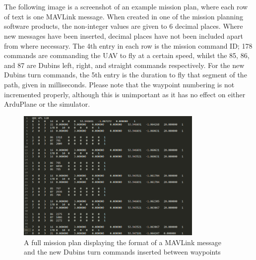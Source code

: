 \chapter{} 
\label{app:missionplan}

\graphicspath{{Appendix2/Figs/}}


\renewcommand{\thefigure}{B\arabic{figure}}

\setcounter{figure}{0}

The following image is a screenshot of an example mission plan, where each row of text is one MAVLink message. When created in one of the mission planning software products, the non-integer values are given to 6 decimal places. Where new messages have been inserted, decimal places have not been included apart from where necessary. The 4th entry in each row is the mission command ID; 178 commands are commanding the UAV to fly at a certain speed, whilst the 85, 86, and 87 are Dubins left, right, and straight commands respectively. For the new Dubins turn commands, the 5th entry is the duration to fly that segment of the path, given in milliseconds. Please note that the waypoint numbering is not incremented properly, although this is unimportant as it has no effect on either ArduPlane or the simulator.

\begin{figure} 
\centering    
\includegraphics[width=0.8\textwidth]{MissionPlan}
\caption{A full mission plan displaying the format of a MAVLink message and the new Dubins turn commands inserted between waypoints}

\end{figure}